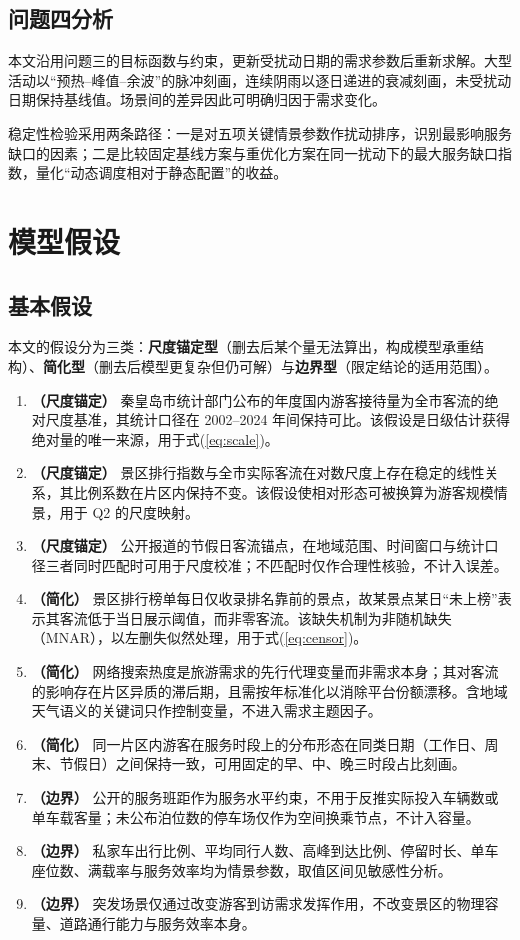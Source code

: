 \documentclass[withoutpreface,bwprint]{cumcmthesis}
\begin{document}
\subsection{问题四分析}
本文沿用问题三的目标函数与约束，更新受扰动日期的需求参数后重新求解。大型活动以“预热--峰值--余波”的脉冲刻画，连续阴雨以逐日递进的衰减刻画，未受扰动日期保持基线值。场景间的差异因此可明确归因于需求变化。

稳定性检验采用两条路径：一是对五项关键情景参数作扰动排序，识别最影响服务缺口的因素；二是比较固定基线方案与重优化方案在同一扰动下的最大服务缺口指数，量化“动态调度相对于静态配置”的收益。


\section{模型假设}
\subsection{基本假设}
本文的假设分为三类：\textbf{尺度锚定型}（删去后某个量无法算出，构成模型承重结构）、\textbf{简化型}（删去后模型更复杂但仍可解）与\textbf{边界型}（限定结论的适用范围）。

\begin{enumerate}[label=\textbf{A\arabic*.},leftmargin=3.0em,itemsep=3pt]
\item\textbf{（尺度锚定）} 秦皇岛市统计部门公布的年度国内游客接待量为全市客流的绝对尺度基准，其统计口径在 2002--2024 年间保持可比。该假设是日级估计获得绝对量的唯一来源，用于式(\ref{eq:scale})。
\item\textbf{（尺度锚定）} 景区排行指数与全市实际客流在对数尺度上存在稳定的线性关系，其比例系数在片区内保持不变。该假设使相对形态可被换算为游客规模情景，用于 Q2 的尺度映射。
\item\textbf{（尺度锚定）} 公开报道的节假日客流锚点，在地域范围、时间窗口与统计口径三者同时匹配时可用于尺度校准；不匹配时仅作合理性核验，不计入误差。
\item\textbf{（简化）} 景区排行榜单每日仅收录排名靠前的景点，故某景点某日“未上榜”表示其客流低于当日展示阈值，而非零客流。该缺失机制为非随机缺失（MNAR），以左删失似然处理，用于式(\ref{eq:censor})。
\item\textbf{（简化）} 网络搜索热度是旅游需求的先行代理变量而非需求本身；其对客流的影响存在片区异质的滞后期，且需按年标准化以消除平台份额漂移。含地域天气语义的关键词只作控制变量，不进入需求主题因子。
\item\textbf{（简化）} 同一片区内游客在服务时段上的分布形态在同类日期（工作日、周末、节假日）之间保持一致，可用固定的早、中、晚三时段占比刻画。
\item\textbf{（边界）} 公开的服务班距作为服务水平约束，不用于反推实际投入车辆数或单车载客量；未公布泊位数的停车场仅作为空间换乘节点，不计入容量。
\item\textbf{（边界）} 私家车出行比例、平均同行人数、高峰到达比例、停留时长、单车座位数、满载率与服务效率均为情景参数，取值区间见敏感性分析。
\item\textbf{（边界）} 突发场景仅通过改变游客到访需求发挥作用，不改变景区的物理容量、道路通行能力与服务效率本身。
\end{enumerate}
\end{document}

